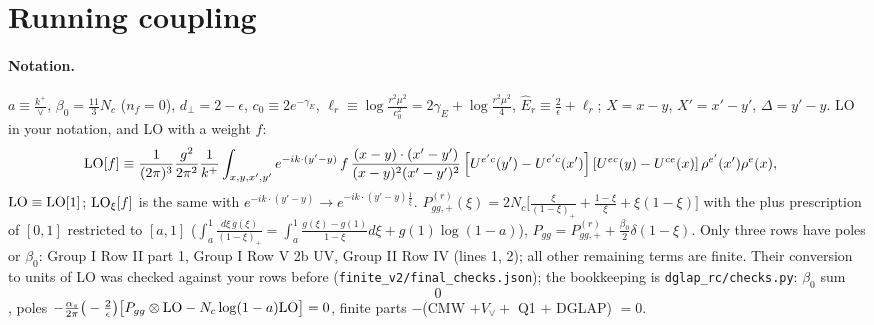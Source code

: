 \documentclass[10pt]{article}
\numberwithin{equation}{section}
\begin{document}
\section{Running coupling}\label{sec:rc}
\paragraph{Notation.} $a\equiv\frac{k^+}{\vee}$, $\beta_0=\frac{11}{3}N_c$ ($n_f=0$), $d_\perp=2-\epsilon$, $c_0\equiv2e^{-\gamma_E}$, $\ell_r\equiv\log\frac{r^2\mu^2}{c_0^2}=2\gamma_E+\log\frac{r^2\mu^2}{4}$, $\hat E_r\equiv\frac2\epsilon+\ell_r$; $X=x-y$, $X'=x'-y'$, $\Delta=y'-y$. LO in your notation, and LO with a weight $f$:
\begin{align*}
{\rm LO}[f]&\equiv\frac{1}{(2\pi)^{3}}\frac{g^{2}}{2\pi^{2}}\frac{1}{k^{+}}\int_{x,y,x',y'}e^{-ik\cdot(y'-y)}\,f\,\frac{(x-y)\cdot(x'-y')}{(x-y)^{2}(x'-y')^{2}}\left[U^{e'c}(y')-U^{e'c}(x')\right]\left[U^{ec}(y)-U^{ce}(x)\right]\rho^{e'}(x')\rho^{e}(x),
\end{align*}
${\rm LO}\equiv{\rm LO}[1]$; ${\rm LO}_\xi[f]$ is the same with $e^{-ik\cdot(y'-y)}\to e^{-ik\cdot(y'-y)\frac1\xi}$. $P^{(r)}_{gg,+}(\xi)=2N_c\big[\frac{\xi}{(1-\xi)_+}+\frac{1-\xi}{\xi}+\xi(1-\xi)\big]$ with the plus prescription of $[0,1]$ restricted to $[a,1]$ ($\int_a^1\frac{d\xi\,g(\xi)}{(1-\xi)_+}=\int_a^1\frac{g(\xi)-g(1)}{1-\xi}d\xi+g(1)\log(1-a)$), $P_{gg}=P^{(r)}_{gg,+}+\frac{\beta_0}{2}\delta(1-\xi)$. Only three rows have poles or $\beta_0$: Group I Row II part 1, Group I Row V 2b UV, Group II Row IV (lines 1, 2); all other remaining terms are finite. Their conversion to units of LO was checked against your rows before (\texttt{finite\_v2/final\_checks.json}); the bookkeeping is \texttt{dglap\_rc/checks.py}: $\beta_0$ sum $$0$$, poles $-\frac{\alpha_s}{2\pi}\big(-\frac{2}{\epsilon}\big)\big[P_{gg}\otimes{\rm LO}-N_c\log(1-a){\rm LO}\big]=0$, finite parts $-$(CMW $+V_\vee+$ Q1 $+$ DGLAP) $=0$.
\end{document}

